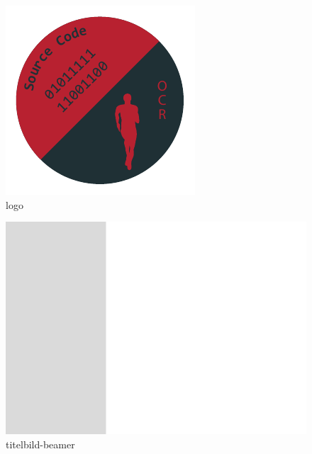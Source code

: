 %
%
\begin{figure}[!hb]%
    \centering
  \includegraphics[width=.80\textwidth]{Grafiken/logo.pdf}%
  \caption{logo}%
\end{figure}

%
%
\begin{figure}[!hb]%
    \centering
  \includegraphics[width=.80\textwidth]{Grafiken/titelbild-beamer.pdf}%
  \caption{titelbild-beamer}%
\end{figure}

